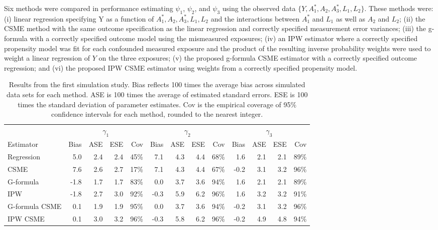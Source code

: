 \documentclass[useAMS,usenatbib,referee]{biom}
\begin{document}
Six methods were compared in performance estimating $\psi_{1}$, $\psi_{2}$, and $\psi_{3}$ using the observed data $\{ Y, A_{1}^{*}, A_{2}, A^{*}_{3}, L_{1}, L_{2} \}$. These methods were: (i) linear regression specifying Y as a function of $A_{1}^{*}, A_{2}, A^{*}_{3}, L_{1}, L_{2}$ and the interactions between $A_{1}^{*}$ and $L_{1}$ as well as $A_{2}$ and $L_{2}$; (ii) the CSME method with the same outcome specification as the linear regression and correctly specified measurement error variances; (iii) the g-formula with a correctly specified outcome model using the mismeasured exposures; (iv) an IPW estimator where a correctly specified propensity model was fit for each confounded measured exposure and the product of the resulting inverse probability weights were used to weight a linear regression of $Y$ on the three exposures; (v) the proposed g-formula CSME estimator with a correctly specified outcome regression; and (vi) the proposed IPW CSME estimator using weights from a correctly specified propensity model.

\begin{table}[]
    \footnotesize
    \caption{Results from the first simulation study. Bias reflects 100 times the average bias across simulated data sets for each method. ASE is 100 times the average of estimated standard errors. ESE is 100 times the standard deviation of parameter estimates. Cov is the empirical coverage of 95$\%$ confidence intervals for each method, rounded to the nearest integer.}
    \begin{center}
    \begin{tabular}{lrrrrrrrrrrrr}
    \hline
        & \multicolumn{4}{c}{$\gamma_{1}$} & \multicolumn{4}{c}{$\gamma_{2}$} & \multicolumn{4}{c}{$\gamma_{3}$} \\
        Estimator & Bias & ASE & ESE & Cov & Bias & ASE & ESE & Cov & Bias & ASE & ESE & Cov \\
         \hline
Regression & 5.0 & 2.4 & 2.4 & 45\% & 7.1 & 4.3 & 4.4 & 68\% & 1.6 & 2.1 & 2.1 & 89\% \\
CSME & 7.6 & 2.6 & 2.7 & 17\% & 7.1 & 4.3 & 4.4 & 67\% & -0.2 & 3.1 & 3.2 & 96\% \\
G-formula & -1.8 & 1.7 & 1.7 & 83\% & 0.0 & 3.7 & 3.6 & 94\% & 1.6 & 2.1 & 2.1 & 89\% \\
IPW & -1.8 & 2.7 & 3.0 & 92\% & -0.3 & 5.9 & 6.2 & 96\% & 1.6 & 3.2 & 3.2 & 91\% \\
G-formula CSME & 0.1 & 1.9 & 1.9 & 95\% & 0.0 & 3.7 & 3.6 & 94\% & -0.2 & 3.1 & 3.2 & 96\% \\
IPW CSME & 0.1 & 3.0 & 3.2 & 96\% & -0.3 & 5.8 & 6.2 & 96\% & -0.2 & 4.9 & 4.8 & 94\% \\
         \hline
    \end{tabular}
    \end{center}
    \label{tab:one}
\end{table}
\end{document}
